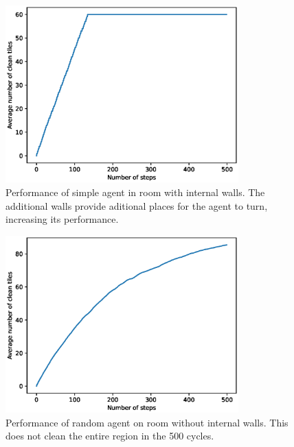 \documentclass{article}
\begin{document}
\begin{figure}
  \centering
  \includegraphics[width=0.8\textwidth]{SimpleExtraWallPerformance}
  \caption{Performance of simple agent in room with internal walls. The additional walls provide aditional places for the agent to turn, increasing its performance. }
  \label{fig:SimpleExtraWall}
\end{figure}
\begin{figure}
  \centering
  \includegraphics[width=0.8\textwidth]{RandomNoWallPerformance}
  \caption{Performance of random agent on room without internal walls. This does not clean the entire region in the 500 cycles.  }
  \label{fig:1}
\end{figure}
\end{document}
